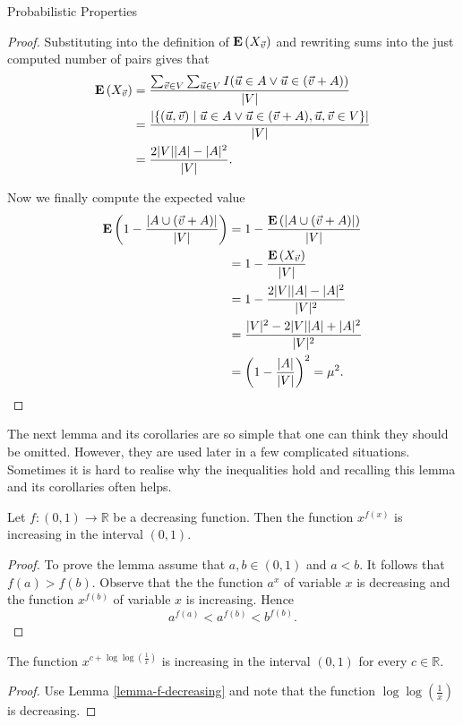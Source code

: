 \begin{section}{Probabilistic Properties}
\begin{lemma}
\begin{proof}
Substituting into the definition of $\mathbf{E}\left(X_{\vec{v}}\right)$ and rewriting sums into the just computed number of pairs gives that
\[
\begin{split}
\mathbf{E}\left(X_{\vec{v}}\right) 
	& = \frac{\sum_{\vec{v} \in V} \sum_{\vec{u} \in V} I(\vec{u} \in A \vee \vec{u} \in (\vec{v} + A))}{|V|}  \\
	& = \frac{|\{(\vec{u}, \vec{v}) \mid \vec{u} \in A \vee \vec{u} \in (\vec{v} + A), \vec{u}, \vec{v} \in V \}|}{|V|} \\ 
	& = \frac{2|V||A| - |A|^2}{|V|} \text{.}
\end{split}
\]

Now we finally compute the expected value
\[
\begin{split}
\mathbf{E}\left(1 - \frac{|A \cup (\vec{v} + A)|}{|V|}\right) 
	& = 1 - \frac{\mathbf{E}\left(|A \cup (\vec{v} + A)|\right)}{|V|}  \\
	& = 1 - \frac{\mathbf{E}\left(X_{\vec{v}}\right)}{|V|} \\
	& = 1 - \frac{2|V||A| - |A|^2}{|V|^2} \\
	& = \frac{|V|^2 - 2|V||A| + |A|^2}{|V|^2} \\
	& = \left(1 - \frac{|A|}{|V|}\right)^2 = \mu^2 \text{.}
\end{split}
\]
\end{proof}
\end{lemma}

The next lemma and its corollaries are so simple that one can think they should be omitted. However, they are used later in a few complicated situations. Sometimes it is hard to realise why the inequalities hold and recalling this lemma and its corollaries often helps.
\begin{lemma}
\label{lemma-f-decreasing}
Let $f: (0, 1) \rightarrow \mathbb{R}$ be a decreasing function. Then the function $x ^ {f(x)}$ is increasing in the interval $(0, 1)$.
\end{lemma}
\begin{proof}
To prove the lemma assume that $a, b \in (0, 1)$ and $a < b$. It follows that $f(a) > f(b)$. Observe that the the function $a ^ x$ of variable $x$ is decreasing and the function $x ^ {f(b)}$ of variable $x$ is increasing. Hence
\[
a ^ {f(a)} < a ^ {f(b)} < b ^ {f(b)} \text{.}
\]
\end{proof}

\begin{corollary}
\label{corollary-f0}
The function $x ^ {c + \log \log \left(\frac{1}{x}\right)}$ is increasing in the interval $(0, 1)$ for every $c \in \mathbb{R}$.
\end{corollary}
\begin{proof}
Use Lemma \ref{lemma-f-decreasing} and note that the function $\log \log \left(\frac{1}{x}\right)$ is decreasing.
\end{proof}


\end{section}
